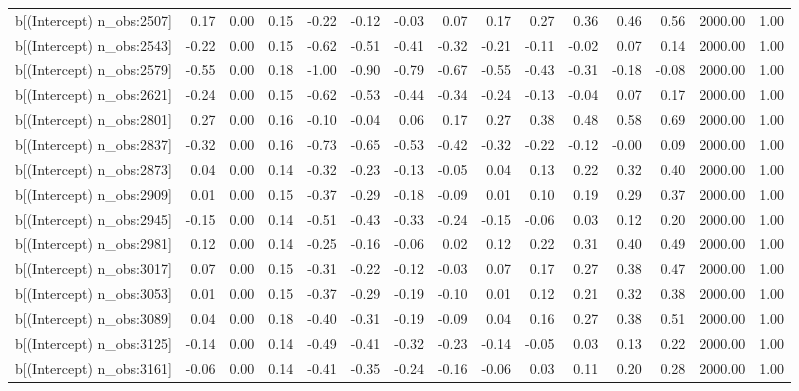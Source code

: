 \begin{table}[ht]
\begin{tabular}{rrrrrrrrrrrrrrr}
  b[(Intercept) n\_obs:2507] & 0.17 & 0.00 & 0.15 & -0.22 & -0.12 & -0.03 & 0.07 & 0.17 & 0.27 & 0.36 & 0.46 & 0.56 & 2000.00 & 1.00 \\ 
  b[(Intercept) n\_obs:2543] & -0.22 & 0.00 & 0.15 & -0.62 & -0.51 & -0.41 & -0.32 & -0.21 & -0.11 & -0.02 & 0.07 & 0.14 & 2000.00 & 1.00 \\ 
  b[(Intercept) n\_obs:2579] & -0.55 & 0.00 & 0.18 & -1.00 & -0.90 & -0.79 & -0.67 & -0.55 & -0.43 & -0.31 & -0.18 & -0.08 & 2000.00 & 1.00 \\ 
  b[(Intercept) n\_obs:2621] & -0.24 & 0.00 & 0.15 & -0.62 & -0.53 & -0.44 & -0.34 & -0.24 & -0.13 & -0.04 & 0.07 & 0.17 & 2000.00 & 1.00 \\ 
  b[(Intercept) n\_obs:2801] & 0.27 & 0.00 & 0.16 & -0.10 & -0.04 & 0.06 & 0.17 & 0.27 & 0.38 & 0.48 & 0.58 & 0.69 & 2000.00 & 1.00 \\ 
  b[(Intercept) n\_obs:2837] & -0.32 & 0.00 & 0.16 & -0.73 & -0.65 & -0.53 & -0.42 & -0.32 & -0.22 & -0.12 & -0.00 & 0.09 & 2000.00 & 1.00 \\ 
  b[(Intercept) n\_obs:2873] & 0.04 & 0.00 & 0.14 & -0.32 & -0.23 & -0.13 & -0.05 & 0.04 & 0.13 & 0.22 & 0.32 & 0.40 & 2000.00 & 1.00 \\ 
  b[(Intercept) n\_obs:2909] & 0.01 & 0.00 & 0.15 & -0.37 & -0.29 & -0.18 & -0.09 & 0.01 & 0.10 & 0.19 & 0.29 & 0.37 & 2000.00 & 1.00 \\ 
  b[(Intercept) n\_obs:2945] & -0.15 & 0.00 & 0.14 & -0.51 & -0.43 & -0.33 & -0.24 & -0.15 & -0.06 & 0.03 & 0.12 & 0.20 & 2000.00 & 1.00 \\ 
  b[(Intercept) n\_obs:2981] & 0.12 & 0.00 & 0.14 & -0.25 & -0.16 & -0.06 & 0.02 & 0.12 & 0.22 & 0.31 & 0.40 & 0.49 & 2000.00 & 1.00 \\ 
  b[(Intercept) n\_obs:3017] & 0.07 & 0.00 & 0.15 & -0.31 & -0.22 & -0.12 & -0.03 & 0.07 & 0.17 & 0.27 & 0.38 & 0.47 & 2000.00 & 1.00 \\ 
  b[(Intercept) n\_obs:3053] & 0.01 & 0.00 & 0.15 & -0.37 & -0.29 & -0.19 & -0.10 & 0.01 & 0.12 & 0.21 & 0.32 & 0.38 & 2000.00 & 1.00 \\ 
  b[(Intercept) n\_obs:3089] & 0.04 & 0.00 & 0.18 & -0.40 & -0.31 & -0.19 & -0.09 & 0.04 & 0.16 & 0.27 & 0.38 & 0.51 & 2000.00 & 1.00 \\ 
  b[(Intercept) n\_obs:3125] & -0.14 & 0.00 & 0.14 & -0.49 & -0.41 & -0.32 & -0.23 & -0.14 & -0.05 & 0.03 & 0.13 & 0.22 & 2000.00 & 1.00 \\ 
  b[(Intercept) n\_obs:3161] & -0.06 & 0.00 & 0.14 & -0.41 & -0.35 & -0.24 & -0.16 & -0.06 & 0.03 & 0.11 & 0.20 & 0.28 & 2000.00 & 1.00 \\ 

\end{tabular}
\end{table}
